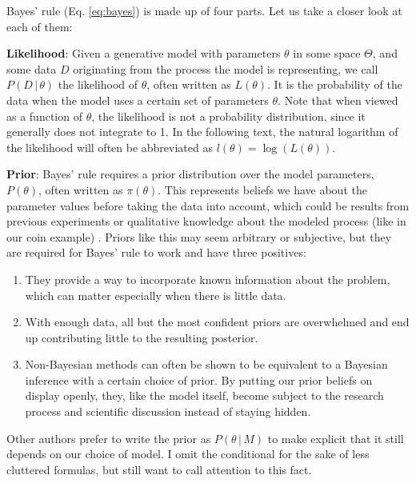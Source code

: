\documentclass[12pt, a4paper]{report}
\begin{document}
Bayes' rule (Eq. \ref{eq:bayes}) is made up of four parts.
Let us take a closer look at each of them:

\textbf{Likelihood}: Given a generative model with parameters $\theta$ in some space $\Theta$, and some data $D$ originating from the process the model is representing, we call $P(D \,|\, \theta)$ the likelihood of $\theta$, often written as $L(\theta)$.
It is the probability of the data when the model uses a certain set of parameters $\theta$.
Note that when viewed as a function of $\theta$, the likelihood is not a probability distribution, since it generally does not integrate to 1.
In the following text, the natural logarithm of the likelihood will often be abbreviated as $l(\theta) = \log(L(\theta))$.

\textbf{Prior}: Bayes' rule requires a prior distribution over the model parameters, $P(\theta)$, often written as $\pi(\theta)$.
This represents beliefs we have about the parameter values before taking the data into account, which could be results from previous experiments or qualitative knowledge about the modeled process (like in our coin example) \cite[p. 34 f.]{mcelreath}.
Priors like this may seem arbitrary or subjective, but they are required for Bayes' rule to work and have three positives:
\begin{enumerate}
    \item They provide a way to incorporate known information about the problem, which can matter especially when there is little data.
    \item With enough data, all but the most confident priors are overwhelmed and end up contributing little to the resulting posterior.
    \item Non-Bayesian methods can often be shown to be equivalent to a Bayesian inference with a certain choice of prior. \cite[36]{mcelreath} By putting our prior beliefs on display openly, they, like the model itself, become subject to the research process and scientific discussion instead of staying hidden. 
\end{enumerate}
Other authors prefer to write the prior as $P(\theta \, | \, M)$ to make explicit that it still depends on our choice of model.
I omit the conditional for the sake of less cluttered formulas, but still want to call attention to this fact.
\end{document}
